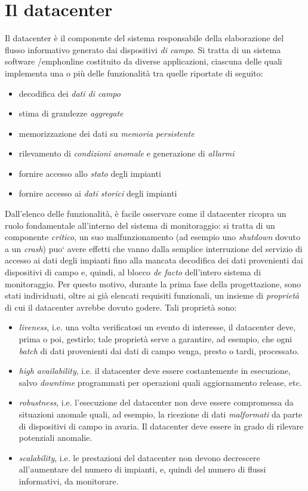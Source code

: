 \clearpage{\pagestyle{empty}\cleardoublepage}
\chapter{Il datacenter}\label{sec:datacenter}
Il datacenter \`e il componente del sistema responsabile della elaborazione 
del flusso informativo generato dai dispositivi \emph{di campo}.
%
Si tratta di un sistema software /emph{online} costituito da 
diverse applicazioni, ciascuna delle quali implementa una o pi\`u delle 
funzionalit\`a tra quelle riportate di seguito:
%
\begin{itemize}
  \item decodifica dei \emph{dati di campo}
  \item stima di grandezze \emph{aggregate}
  \item memorizzazione dei dati su \emph{memoria persistente}
  \item rilevamento di \emph{condizioni anomale} e generazione di \emph{allarmi}
  \item fornire accesso allo \emph{stato} degli impianti
  \item fornire accesso ai \emph{dati storici} degli impianti
\end{itemize}
%

%
Dall'elenco delle funzionalit\`a, \`e facile osservare come il
datacenter ricopra un ruolo fondamentale all'interno del sistema di monitoraggio: 
si tratta di un componente \emph{critico}, un suo malfunzionamento 
(ad esempio uno \emph{shutdown} dovuto a un \emph{crash}) puo` avere effetti che 
vanno dalla semplice interruzione del servizio di accesso ai dati degli impianti 
fino alla mancata decodifica dei dati provenienti dai dispositivi di campo e, 
quindi, al blocco \emph{de facto} dell'intero sistema di monitoraggio.
%
Per questo motivo, durante la prima fase della progettazione, sono stati 
individuati, oltre ai gi\`a elencati requisiti funzionali, un insieme di 
\emph{propriet\`a} di cui il datacenter avrebbe dovuto godere. Tali propriet\`a 
sono:
%
\begin{itemize}
\item \emph{liveness}, i.e. una volta verificatosi un evento di interesse, 
il datacenter deve, prima o poi, gestirlo; tale propriet\`a serve a garantire, ad 
esempio, che ogni \emph{batch} di dati provenienti dai dati di campo venga, 
presto o tardi, processato.
%
\item \emph{high availability}, i.e. il datacenter deve essere costantemente 
in esecuzione, salvo \emph{downtime} programmati per operazioni quali 
aggiornamento release, etc.
%
\item \emph{robustness}, i.e. l'esecuzione del datacenter non deve essere 
compromessa da situazioni anomale quali, ad esempio, la ricezione di dati 
\emph{malformati} da parte di dispositivi di campo in avaria. Il datacenter 
deve essere in grado di rilevare potenziali anomalie.%
%
\item \emph{scalability}, i.e. le prestazioni del datacenter non devono 
decrescere all'aumentare del numero di impianti, e, quindi del numero di 
flussi informativi, da monitorare. %
%
\end{itemize}
%

